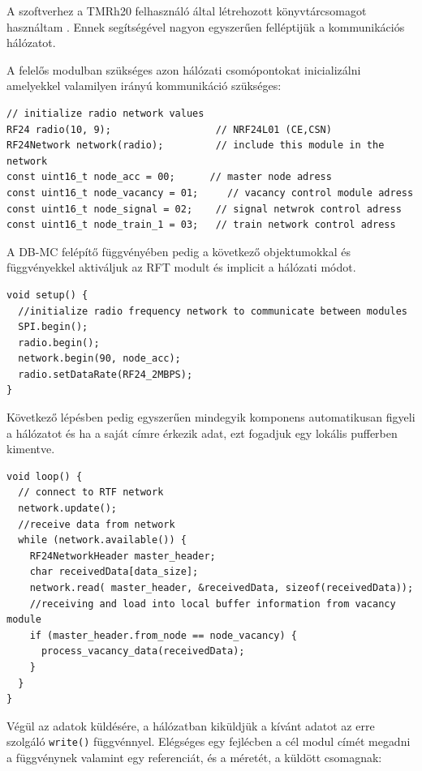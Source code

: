 \documentclass[a4paper,12pt]{article}
\begin{document}
A szoftverhez a TMRh20 felhasználó által létrehozott könyvtárcsomagot használtam \cite{tmr19}.
Ennek segítségével nagyon egyszerűen felléptijük a kommunikációs hálózatot.

A felelős modulban szükséges azon hálózati csomópontokat inicializálni amelyekkel valamilyen irányú kommunikáció szükséges: 
\begin{lstlisting}[style=CStyle, caption={RFC kommunikáció inicializálás az ACC-ben},label=code:acc_rfc_init]
// initialize radio network values
RF24 radio(10, 9);                  // NRF24L01 (CE,CSN)
RF24Network network(radio);         // include this module in the network
const uint16_t node_acc = 00;      // master node adress
const uint16_t node_vacancy = 01;     // vacancy control module adress
const uint16_t node_signal = 02;    // signal netwrok control adress
const uint16_t node_train_1 = 03;   // train network control adress
\end{lstlisting}

A DB-MC felépítő függvényében pedig a következő objektumokkal és függvényekkel aktiváljuk az RFT modult és implicit a hálózati módot.

\begin{lstlisting}[style=CStyle, caption={RFC kommunikáció felépítése az ACC-ben},label=code:acc_rfc_setup]
void setup() {
  //initialize radio frequency network to communicate between modules
  SPI.begin();
  radio.begin();
  network.begin(90, node_acc);
  radio.setDataRate(RF24_2MBPS);
}
\end{lstlisting}

Következő lépésben pedig egyszerűen mindegyik komponens automatikusan figyeli a hálózatot és ha a saját címre érkezik adat, ezt fogadjuk egy lokális pufferben kimentve.

\begin{lstlisting}[style=CStyle, caption={RFC kommunikáció adatok fogadása az ACC-ben},label=code:acc_rfc_rec]
void loop() {
  // connect to RTF network
  network.update();
  //receive data from network
  while (network.available()) {
    RF24NetworkHeader master_header;
    char receivedData[data_size];
    network.read( master_header, &receivedData, sizeof(receivedData));
    //receiving and load into local buffer information from vacancy module
    if (master_header.from_node == node_vacancy) {
      process_vacancy_data(receivedData);
    }
  }
}
\end{lstlisting}

Végül az adatok küldésére, a hálózatban kiküldjük a kívánt adatot az erre szolgáló \texttt{write()} függvénnyel.
Elégséges egy fejlécben a cél modul címét megadni a függvénynek valamint egy referenciát, és a méretét, a küldött csomagnak:
\end{document}
